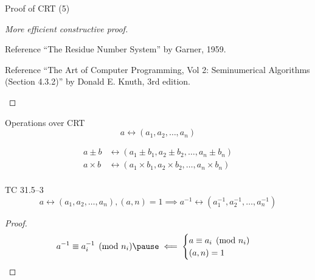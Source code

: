 \begin{frame}{Proof of CRT (5)}
  \begin{proof}[More efficient constructive proof]
	\begin{alertblock}{Reference}
	  ``The Residue Number System'' by Garner, 1959.
	\end{alertblock}

	\begin{alertblock}{Reference}
	  ``The Art of Computer Programming, Vol 2: Seminumerical Algorithms (Section 4.3.2)'' by Donald E. Knuth, 3rd edition.
	\end{alertblock}
  \end{proof}
\end{frame}
\begin{frame}{Operations over CRT}
  \[
	a \leftrightarrow (a_1, a_2, \ldots, a_n)
  \]

  \begin{align*}
	a \pm b &\leftrightarrow (a_1 \pm b_1, a_2 \pm b_2, \ldots, a_n \pm b_n) \\
	a \times b &\leftrightarrow (a_1 \times b_1, a_2 \times b_2, \ldots, a_n \times b_n) \\
  \end{align*}

  \pause
  \vspace{-0.30cm}

  \begin{exampleblock}{TC 31.5--3}
	\[
	 a \leftrightarrow (a_1, a_2, \ldots, a_n), (a,n) = 1 \implies a^{-1} \leftrightarrow (a_1^{-1}, a_2^{-1}, \ldots, a_n^{-1})
	\]
  \end{exampleblock}

  \pause
  \begin{proof}
	\begin{equation*}
	  a^{-1} \equiv a_i^{-1} \pmod{n_i} \pause \impliedby \begin{cases}
		a \equiv a_i \pmod{n_i} \\
		(a,n) = 1
	  \end{cases}
	\end{equation*}
  \end{proof}
\end{frame}
